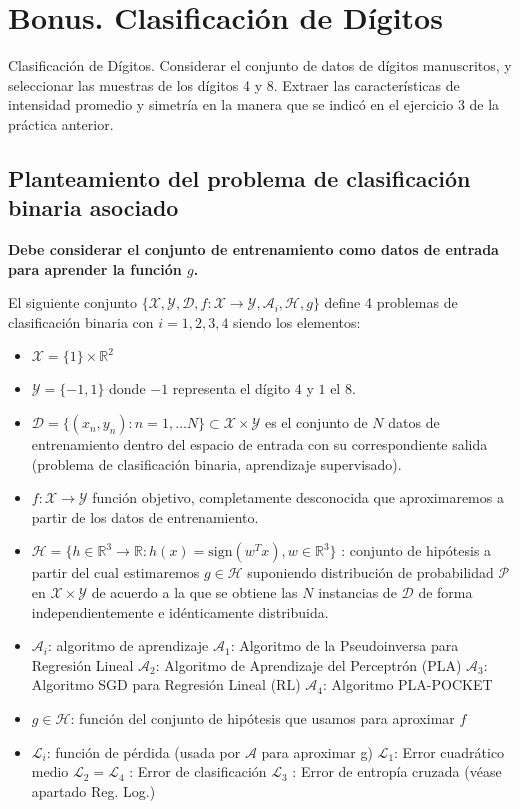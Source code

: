 \chapter{Bonus. Clasificación de Dígitos}

Clasificación de Dígitos. Considerar el conjunto de datos de dígitos
manuscritos, y seleccionar las muestras de los dígitos 4 y 8. 
Extraer las características de intensidad promedio y simetría en la
manera que se indicó en el ejercicio 3 de la práctica anterior.

\section{Planteamiento del problema de clasificación binaria asociado}

\textbf{Debe considerar el conjunto de entrenamiento como datos de entrada para aprender
la función $g$.}

El siguiente conjunto $\{\mathcal{X}, \mathcal{Y}, \mathcal{D}, f: \mathcal{X} \rightarrow \mathcal{Y}, \mathcal{A}_i, \mathcal{H}, g\}$
define 4 problemas de clasificación binaria con $i=1,2,3,4$ siendo los elementos:

\begin{itemize}
  \item $\mathcal{X} = \{1\} \times \mathbb{R}^2$
  \item $\mathcal{Y} = \{-1, 1\}$ donde $-1$ representa el dígito $4$ y $1$ el $8$.
  \item $\mathcal{D} = \{(x_n, y_n): n = 1,\dots N \} \subset \mathcal{X} \times \mathcal{Y}$
es el conjunto de $N$ datos de entrenamiento dentro del espacio de entrada con su correspondiente
salida (problema de clasificación binaria, aprendizaje supervisado).
  \item $f : \mathcal{X} \rightarrow \mathcal{Y}$ función objetivo, completamente desconocida que
aproximaremos a partir de los datos de entrenamiento.
  \item $\mathcal{H} = \{h \in \mathbb{R}^3 \rightarrow \mathbb{R} : h(x) = \text{sign}(w^Tx), w \in \mathbb{R}^3 \}$ : 
conjunto de hipótesis a partir del cual estimaremos $g \in \mathcal{H}$ suponiendo distribución de probabilidad
$\mathcal{P}$ en $\mathcal{X} \times \mathcal{Y}$ de acuerdo a la que se obtiene las $N$ instancias de $\mathcal{D}$ 
de forma independientemente e idénticamente distribuida.
  \item $\mathcal{A}_i$: algoritmo de aprendizaje
    \subitem $\mathcal{A}_1$: Algoritmo de la Pseudoinversa para Regresión Lineal
    \subitem $\mathcal{A}_2$: Algoritmo de Aprendizaje del Perceptrón (PLA)
    \subitem $\mathcal{A}_3$: Algoritmo SGD para Regresión Lineal (RL)
    \subitem $\mathcal{A}_4$: Algoritmo PLA-POCKET
  \item $g \in \mathcal{H}$: función del conjunto de hipótesis que usamos para aproximar $f$
  \item $\mathcal{L}_i$: función de pérdida (usada por $\mathcal{A}$ para aproximar g)
    \subitem $\mathcal{L}_1$: Error cuadrático medio
    \subitem $\mathcal{L}_2 = \mathcal{L}_4$ : Error de clasificación
    \subitem $\mathcal{L}_3$ : Error de entropía cruzada (véase apartado Reg. Log.)
\end{itemize}

